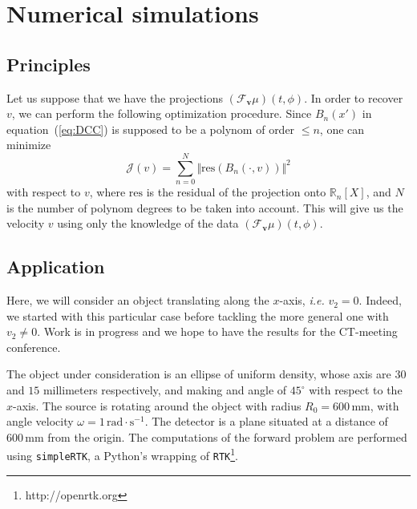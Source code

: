 \documentclass[9pt,technote]{IEEEtran}
\numberwithin{equation}{section}
\newcommand{\R}{\mathbb{R}}
\newcommand{\ie}{\emph{i.e.} }
\newcommand{\Tbv}{\mathcal{F}_{\mathbf{v}}}
\begin{document}
\section{Numerical simulations}

\subsection{Principles}
\label{sub:principles}
Let us suppose that we have the projections $\left( \Tbv \mu \right)(t,\phi)$. In order to recover $v$, we can perform the following optimization procedure. Since $B_n(x')$ in equation~(\ref{eq:DCC}) is supposed to be a polynom of order $\leq n$, one can minimize
\begin{equation}
	\mathcal{J}(v) = \sum_{n=0}^N \Vert \textrm{res} \left( B_n(\cdot,v) \right) \Vert^2
\end{equation}
with respect to $v$, where $\textrm{res}$ is the residual of the projection onto $\R_n[X]$, and $N$ is the number of polynom degrees to be taken into account. This will give us the velocity $v$ using only the knowledge of the data $\left( \Tbv \mu \right)(t,\phi)$.

\subsection{Application}
\label{sub:application}
Here, we will consider an object translating along the $x$-axis, \ie $v_2=0$. Indeed, we started with this particular case before tackling the more general one with $v_2 \neq 0$. Work is in progress and we hope to have the results for the CT-meeting conference. 

The object under consideration is an ellipse of uniform density, whose axis are $30$ and $15$ millimeters respectively, and making and angle of $45^{\circ}$ with respect to the $x$-axis. The source is rotating around the object with radius $R_0 = 600 \, \textrm{mm}$, with angle velocity $\omega = 1 \, \textrm{rad} \cdot \textrm{s}^{-1}$. The detector is a plane situated at a distance of $600 \, \textrm{mm}$ from the origin. The computations of the forward problem are performed using \verb+simpleRTK+, a Python's wrapping of \verb+RTK+\footnote{http://openrtk.org}.
\end{document}
